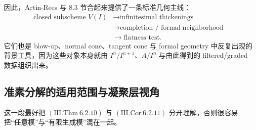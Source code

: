 \documentclass[a4paper]{ctexart}
\theoremstyle{definition}
\theoremstyle{analysis}
\theoremstyle{plain}
\begin{document}
因此，Artin-Rees 与 8.3 节合起来提供了一条标准几何主线：
\[
\begin{aligned}
  \text{closed subscheme }V(I)
  &\longrightarrow
  \text{infinitesimal thickenings} \\
  &\longrightarrow
  \text{completion / formal neighborhood} \\
  &\longrightarrow
  \text{flatness test}.
\end{aligned}
\]
它们也是 blow-up、normal cone、tangent cone 与 formal geometry 中反复出现的背景工具，因为这些对象本身就由 \(I^n/I^{n+1}\)、\(A/I^n\) 与由此得到的 filtered/graded 数据组织出来。

\subsection{准素分解的适用范围与凝聚层视角}\label{subsec:topic-primary-coherent}

这一段最好把 \((\mathrm{III.Thm}\ 6.2.10)\) 与 \((\mathrm{III.Cor}\ 6.2.11)\) 分开理解，否则很容易把“任意模”与“有限生成模”混在一起。
\end{document}
